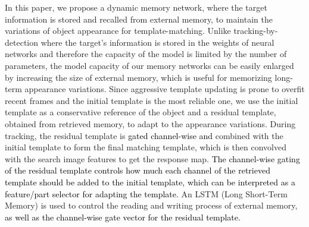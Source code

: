 \documentclass[runningheads]{llncs}
\newcommand{\abc}[1]{\textcolor{black}{#1}}
\begin{document}
In this paper, we propose a dynamic memory network, where the target information is stored and recalled from  external memory,  to maintain the variations of object appearance for template-matching.
Unlike tracking-by-detection  where the target's information is stored in the weights of neural networks and therefore the capacity of the model is limited by the number of parameters, the model capacity of our memory networks can be easily enlarged by increasing the size of external memory, which is useful for memorizing long-term appearance variations. 
%
Since aggressive template updating is prone to overfit recent frames and the initial template is the most reliable one,
we use the initial template as a conservative reference of the object and a residual template, %
obtained from retrieved memory, to adapt to the appearance variations.
%
During tracking, the residual template is %
\abc{gated channel-wise and} 
combined with the initial template to form the final matching template, which is then convolved with the search image features to get the response map.
\abc{The channel-wise gating of the residual template controls how much each channel of the retrieved template should be added to the initial template, which can be interpreted as a feature/part selector for adapting the template.}
%
An LSTM (Long Short-Term Memory) is used to control the reading and writing process of external memory, 
\abc{as well as the channel-wise gate vector for the residual template.}
\end{document}
